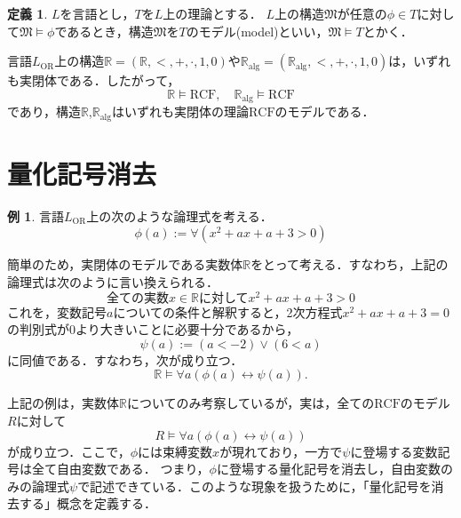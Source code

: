\documentclass[uplatex, dvipdfmx]{jsarticle}
\newcommand{\R}{\mathbb{R}}
\newcommand{\Ralg}{\mathbb{R}_\mathrm{alg}}
\newcommand{\M}{\mathfrak{M}}
\newcommand{\RCF}{\mathrm{RCF}}
\theoremstyle{definition}
\newtheorem{definition}{定義}[section]
\newtheorem{example}{例}[section]
\begin{document}
\begin{definition}
     $L$を言語とし，$T$を$L$上の理論とする．
     $L$上の構造$\M$が任意の$\phi \in T$に対して$\M\models \phi$であるとき，構造$\M$を$T$のモデル(model)といい，$\M \models T$とかく．
\end{definition}

言語$L_\mathrm{OR}$上の構造$\R=(\R,<,+,\cdot,1,0)$や$\Ralg=(\Ralg,<,+,\cdot,1,0)$は，いずれも実閉体である．したがって，
\[
     \R \models \RCF, \quad \Ralg \models \RCF
\]
であり，構造$\R$,$\Ralg$はいずれも実閉体の理論$\RCF$のモデルである．

\section{量化記号消去}

\begin{example}
     言語$L_\mathrm{OR}$上の次のような論理式を考える．
     \begin{equation*}
          \phi(a) := \forall (x^2 + ax + a + 3 > 0)
     \end{equation*}

     簡単のため，実閉体のモデルである実数体$\R$をとって考える．すなわち，上記の論理式は次のように言い換えられる．
     \begin{equation*}
          \text{全ての実数$x \in \R$に対して} x^2 + ax + a + 3 > 0
     \end{equation*}
     これを，変数記号$a$についての条件と解釈すると，2次方程式$x^2 + ax + a + 3 = 0$の判別式が0より大きいことに必要十分であるから，
     \begin{equation*}
          \psi(a) := (a < -2) \lor (6 < a)
     \end{equation*}
     に同値である．すなわち，次が成り立つ．
     \begin{equation*}
          \R \models \forall a (\phi(a) \leftrightarrow \psi(a)).
     \end{equation*}
\end{example}

上記の例は，実数体$\R$についてのみ考察しているが，実は，全ての$\RCF$のモデル$R$に対して
\begin{equation*}
     R \models \forall a (\phi(a) \leftrightarrow \psi(a))
\end{equation*}
が成り立つ．ここで，$\phi$には束縛変数$x$が現れており，一方で$\psi$に登場する変数記号は全て自由変数である．
つまり，$\phi$に登場する量化記号を消去し，自由変数のみの論理式$\psi$で記述できている．このような現象を扱うために，「量化記号を消去する」概念を定義する．
\end{document}
